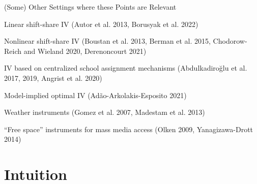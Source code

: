 \documentclass{beamer}
\begin{document}
\begin{frame}{(Some) Other Settings where these Points are Relevant}
  
{\small
Linear shift-share IV {\small\color{gray}(Autor et al. 2013, Borusyak et al. 2022)}
	
\vspace{0.2cm}
Nonlinear shift-share IV {\small\color{gray}(Boustan et al. 2013, Berman et al. \phantom{Z}2015, Chodorow-Reich and Wieland 2020, Derenoncourt 2021)} 
	
\vspace{0.2cm}
IV based on centralized school assignment mechanisms {\small\color{gray}(Abdulkadiro\u{g}lu et al. 2017, 2019, Angrist et al. 2020)}

\vspace{0.2cm}
Model-implied optimal IV {\small\color{gray}(Ad\~{a}o-Arkolakis-Esposito 2021)}

\vspace{0.2cm}
Weather instruments {\small\color{gray}(Gomez et al. 2007, Madestam et al. 2013)}%

\vspace{0.2cm}
``Free space'' instruments for mass media access {\small\color{gray}(Olken 2009, Yanagizawa-Drott 2014)}

}
\end{frame}

\section{Intuition}
\end{document}
